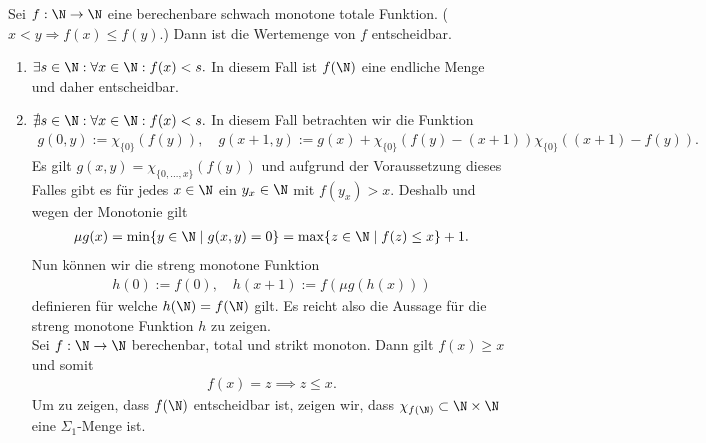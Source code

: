 
\begin{exercise}[215]

\phantom{}

	Sei $f:\N \to \N$ eine berechenbare schwach monotone totale Funktion. ($x < y \Rightarrow f(x) \leq f(y)$.) Dann ist die Wertemenge von $f$ entscheidbar.

\end{exercise}


\begin{solution}

\phantom{}

	\begin{enumerate}[label = Fall \arabic*:]
		\item $\exists s \in \N: \forall x \in \N: f(x) < s.$ In diesem Fall ist $f(\N)$ eine endliche Menge und daher entscheidbar.
		\item $\nexists s \in \N: \forall x \in \N: f(x) < s.$ In diesem Fall betrachten wir die Funktion
			\begin{align*}
			g(0,y) := \chi_{\{0\}}(f(y)), \quad g(x + 1, y) := g(x) + \chi_{\{0\}}(f(y) - (x + 1)) \chi_{\{0\}}((x + 1) - f(y)).
			\end{align*}
			Es gilt $g(x,y) = \chi_{\{0, \dots, x\}}(f(y))$ und aufgrund der Voraussetzung dieses Falles gibt es für jedes $x \in \N$ ein $y_x \in \N$ mit $f(y_x) > x$. Deshalb und wegen der Monotonie gilt
			\begin{align*}
			\mu g(x) = \min\{y \in \N \mid g(x,y) = 0\} = \max\{z \in \N \mid f(z) \leq x\} + 1.
			\end{align*}
			Nun können wir die streng monotone Funktion
			\begin{align*}
			h(0) := f(0), \quad h(x + 1) := f(\mu g(h(x)))
			\end{align*}
			definieren für welche $h(\N) = f(\N)$ gilt. Es reicht also die Aussage für die streng monotone Funktion $h$ zu zeigen. \\
			Sei $f: \N \to \N$ berechenbar, total und strikt monoton. Dann gilt $f(x) \geq x$
			und somit
			\begin{align*}
				f(x) = z \implies z \leq x.
			\end{align*}
			Um zu zeigen, dass $f(\N)$ entscheidbar ist, zeigen wir, dass
			$\chi_{f(\N)} \subset \N \times \N$ eine $\Sigma_1$-Menge ist.

\end{enumerate}
\end{solution}
